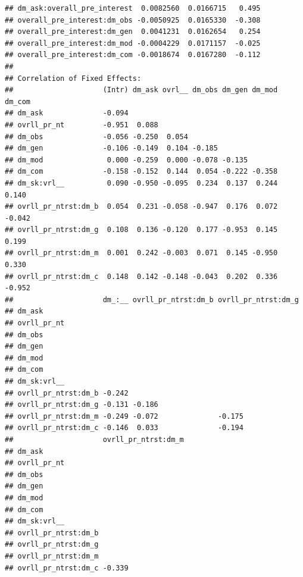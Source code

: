 \documentclass[]{msu-thesis}
\theoremstyle{definition}
\theoremstyle{definition}
\theoremstyle{definition}
\theoremstyle{remark}
\begin{document}
\begin{verbatim}
## dm_ask:overall_pre_interest  0.0082560  0.0166715   0.495
## overall_pre_interest:dm_obs -0.0050925  0.0165330  -0.308
## overall_pre_interest:dm_gen  0.0041231  0.0162654   0.254
## overall_pre_interest:dm_mod -0.0004229  0.0171157  -0.025
## overall_pre_interest:dm_com -0.0018674  0.0167280  -0.112
## 
## Correlation of Fixed Effects:
##                     (Intr) dm_ask ovrl__ dm_obs dm_gen dm_mod dm_com
## dm_ask              -0.094                                          
## ovrll_pr_nt         -0.951  0.088                                   
## dm_obs              -0.056 -0.250  0.054                            
## dm_gen              -0.106 -0.149  0.104 -0.185                     
## dm_mod               0.000 -0.259  0.000 -0.078 -0.135              
## dm_com              -0.158 -0.152  0.144  0.054 -0.222 -0.358       
## dm_sk:vrl__          0.090 -0.950 -0.095  0.234  0.137  0.244  0.140
## ovrll_pr_ntrst:dm_b  0.054  0.231 -0.058 -0.947  0.176  0.072 -0.042
## ovrll_pr_ntrst:dm_g  0.108  0.136 -0.120  0.177 -0.953  0.145  0.199
## ovrll_pr_ntrst:dm_m  0.001  0.242 -0.003  0.071  0.145 -0.950  0.330
## ovrll_pr_ntrst:dm_c  0.148  0.142 -0.148 -0.043  0.202  0.336 -0.952
##                     dm_:__ ovrll_pr_ntrst:dm_b ovrll_pr_ntrst:dm_g
## dm_ask                                                            
## ovrll_pr_nt                                                       
## dm_obs                                                            
## dm_gen                                                            
## dm_mod                                                            
## dm_com                                                            
## dm_sk:vrl__                                                       
## ovrll_pr_ntrst:dm_b -0.242                                        
## ovrll_pr_ntrst:dm_g -0.131 -0.186                                 
## ovrll_pr_ntrst:dm_m -0.249 -0.072              -0.175             
## ovrll_pr_ntrst:dm_c -0.146  0.033              -0.194             
##                     ovrll_pr_ntrst:dm_m
## dm_ask                                 
## ovrll_pr_nt                            
## dm_obs                                 
## dm_gen                                 
## dm_mod                                 
## dm_com                                 
## dm_sk:vrl__                            
## ovrll_pr_ntrst:dm_b                    
## ovrll_pr_ntrst:dm_g                    
## ovrll_pr_ntrst:dm_m                    
## ovrll_pr_ntrst:dm_c -0.339
\end{verbatim}
\end{document}

